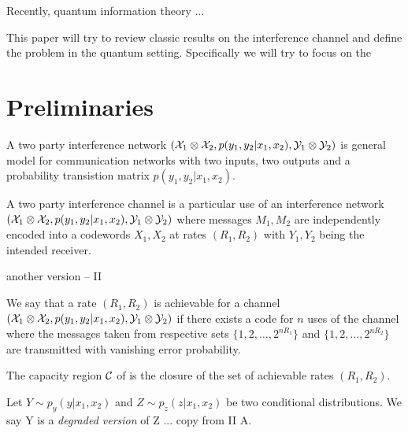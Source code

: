\documentclass[aps,11pt,twoside,letterpaper]{article}
\begin{document}
    Recently, quantum information theory ...
    
    This paper will try to review classic results on the interference channel and
    define the problem in the quantum setting.
    Specifically we will try to focus on the 
    
    
    
    
 \section{Preliminaries}

	
        \begin{definition}
            A two party interference network $({\cal X}_1 \otimes {\cal X}_2, p(y_1,y_2|x_1,x_2), {\cal Y}_1 \otimes {\cal Y}_2)$ 
            is general model for communication networks with two inputs, two outputs and a probability transistion
            matrix $p(y_1,y_2|x_1,x_2)$.
        \end{definition}
        
        

        \begin{definition}
            A two party interference channel is a particular use of an interference network 
            $({\cal X}_1 \otimes {\cal X}_2, p(y_1,y_2|x_1,x_2), {\cal Y}_1 \otimes {\cal Y}_2)$ 
            where messages $M_1,M_2$ are independently encoded into a codewords $X_1,X_2$ 
            at rates $(R_1,R_2)$ with $Y_1,Y_2$ being the intended receiver.
        \end{definition}

        another version -- II

        
        \begin{definition}
            We say that a rate $(R_1,R_2)$ is achievable for a channel $({\cal X}_1 \otimes {\cal X}_2, p(y_1,y_2|x_1,x_2), {\cal Y}_1 \otimes {\cal Y}_2)$
            if there exists a code for $n$ uses of the channel where the messages taken from respective sets $\{1,2,\ldots,2^{nR_1} \}$ and
             $\{1,2,\ldots,2^{nR_2} \}$ are transmitted with vanishing error probability.
        \end{definition}
        
        
        \begin{definition}[Capacity]
            The capacity region ${\cal C}$ of is the closure of the set of achievable rates $(R_1,R_2)$.
        \end{definition}


        \begin{definition}
            Let $Y \sim p_y(y|x_1,x_2)$ and $Z \sim p_z(z|x_1,x_2)$ be two conditional distributions.
            We say Y is a \emph{degraded version} of Z ...
            copy from \cite{Carleial83} II A.
        \end{definition}
\end{document}

